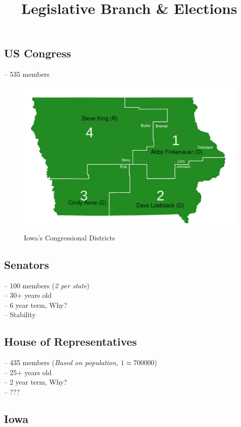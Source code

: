 \documentclass[]{article}
\title{Legislative Branch \& Elections}
\author{}
\date{}
\begin{document}
\maketitle

\subsection*{US Congress}
-- 535 members

\begin{figure}
	\includegraphics[width=1.1\linewidth]{iowa-districts.png}
	\caption{Iowa's Congressional Districts}
\end{figure}

\subsection*{Senators}
-- 100 members (\emph{2 per state}) \\
-- 30+ years old \\
-- 6 year term, Why? \\
\indent-- Stability

\subsection*{House of Representatives}
-- 435 members (\emph{Based on population, $1 \approx 700000$}) \\
-- 25+ years old \\
-- 2 year term, Why? \\
\indent-- ???

\subsection*{Iowa}
\end{document}
